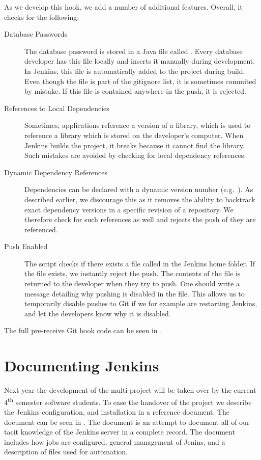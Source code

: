 As we develop this hook, we add a number of additional features. Overall, it checks for the following:
\begin{description}
  \item[Database Passwords] The database password is stored in a Java file called . Every database developer has this file locally and inserts it manually during development. In Jenkins, this file is automatically added to the project during build. Even though the file is part of the gitignore list, it is sometimes commited by mistake. If this file is contained anywhere in the push, it is rejected.
  \item[References to Local Dependencies] Sometimes, applications reference a  version of a library, which is used to reference a library which is stored on the developer's computer. When Jenkins builds the project, it breaks because it cannot find the library. Such mistakes are avoided by checking for local dependency references.
  \item[Dynamic Dependency References] Dependencies can be declared with a dynamic version number (e.g.\ ). As described earlier, we discourage this as it removes the ability to backtrack exact dependency versions in a specific revision of a repository. We therefore check for such references as well and rejects the push of they are referenced.
  \item[Push Enabled] The script checks if there exists a file called  in the Jenkins home folder. If the file exists, we instantly reject the push. The contents of the file is returned to the developer when they try to push. One should write a message detailing why pushing is disabled in the file. This allows us to temporarily disable pushes to Git if we for example are restarting Jenkins, and let the developers know why it is disabled.
\end{description}
The full pre-receive Git hook code can be seen in .

\section{Documenting Jenkins}\label{sec:jenkins_doc}
Next year the development of the multi-project will be taken over by the current 4\textsuperscript{th} semester software students. To ease the handover of the project we describe the Jenkins configuration, and installation in a reference document. The document can be seen in . The document is an attempt to document all of our tacit knowledge of the Jenkins server in a complete record. The document includes how jobs are configured, general management of Jenins, and a description of files used for automation.